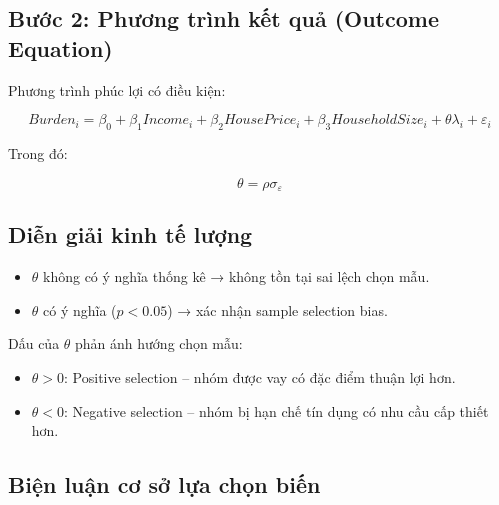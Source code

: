 \documentclass[12pt,a4paper]{report}
\begin{document}
\subsection{Bước 2: Phương trình kết quả (Outcome Equation)}

Phương trình phúc lợi có điều kiện:

\begin{equation}
	\label{eq:outcome}
	Burden_i =
	\beta_0
	+ \beta_1 Income_i
	+ \beta_2 HousePrice_i
	+ \beta_3 HouseholdSize_i
	+ \theta \lambda_i
	+ \varepsilon_i
\end{equation}

Trong đó:

\begin{equation}
	\theta = \rho \sigma_\varepsilon
\end{equation}


\subsection{Diễn giải kinh tế lượng}

\begin{itemize}
	\item $\theta$ không có ý nghĩa thống kê → không tồn tại sai lệch chọn mẫu.
	\item $\theta$ có ý nghĩa ($p<0.05$) → xác nhận sample selection bias.
\end{itemize}

Dấu của $\theta$ phản ánh hướng chọn mẫu:

\begin{itemize}
	\item $\theta > 0$: Positive selection -- nhóm được vay có đặc điểm thuận lợi hơn.
	\item $\theta < 0$: Negative selection -- nhóm bị hạn chế tín dụng có nhu cầu cấp thiết hơn.
\end{itemize}


\subsection{Biện luận cơ sở lựa chọn biến}
\end{document}
